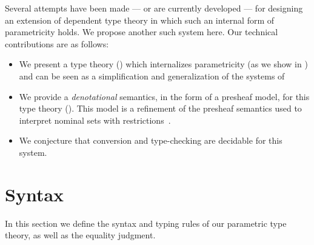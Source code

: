 \documentclass[english]{PaperTools/latex/lipics}
\begin{document}
Several attempts have been made
\citep{bernardy_computational_2012,bernardy_type-theory_2013} --- or are currently
developed \citep{altenkirch2014syntax} ---
for designing an extension of dependent type theory in which such an internal form of
parametricity holds. We propose another such system here.
Our technical contributions are as follows:
\begin{itemize}
\item We present a type theory () which internalizes parametricity (as we show in )
  and can be seen as a simplification and generalization of the systems of
  \cite{bernardy_computational_2012,bernardy_type-theory_2013}
\item We provide a \emph{denotational} semantics, in the form of a presheaf model, for this type theory ().
      This model is a refinement of the presheaf semantics used to
      interpret nominal sets with
      restrictions~\citep{bezem2014model,DBLP:journals/corr/Pitts14}.
\item We conjecture that conversion and type-checking are decidable for this system.
\end{itemize}

\section{Syntax}
\label{sec:syntax}
In this section we define the syntax and typing rules of our
parametric type theory, as well as the equality judgment.
\end{document}
